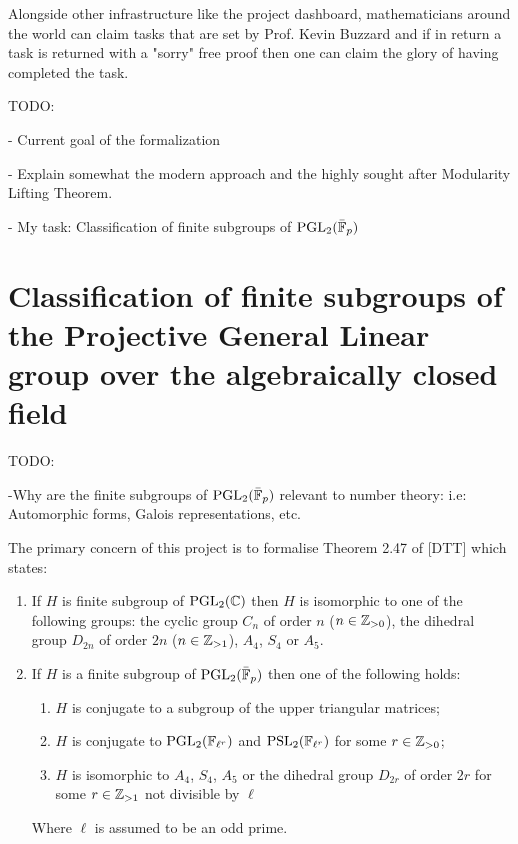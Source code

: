 Alongside other infrastructure like the project dashboard, mathematicians around the world can claim tasks that are set by Prof. Kevin Buzzard and if in return a task is returned with a "sorry" free proof then one can claim the glory of having completed the task.

TODO:

- Current goal of the formalization

- Explain somewhat the modern approach and the highly sought after Modularity Lifting Theorem.

- My task: Classification of finite subgroups of $\operatorname{PGL}_2(\bar{\mathbb{F}}_p)$



\section{Classification of finite subgroups of the Projective General Linear group over the algebraically closed field}

TODO:

-Why are the finite subgroups of  $\operatorname{PGL}_2(\bar{\mathbb{F}}_p)$ relevant to number theory: i.e: Automorphic forms, Galois representations, etc.


The primary concern of this project is to formalise Theorem 2.47 of [DTT] which states:

\begin{enumerate}
    \item If $H$ is finite subgroup of $\operatorname{PGL}_2(\mathbb{C})$ then $H$ is isomorphic to one of the following groups: the cyclic group $C_n$ of order $n$ ($n \in \mathbb{Z}_{>0}$), the dihedral group $D_{2n}$ of order $2n$ ($n \in \mathbb{Z}_{>1}$), $A_4$, $S_4$ or $A_5$.
\item If $H$ is a finite subgroup of $\operatorname{PGL}_2(\bar{\mathbb{F}}_p)$ then one of the following holds:
\begin{enumerate}
    \item $H$ is conjugate to a subgroup of the upper triangular matrices;
    \item $H$ is conjugate to $\operatorname{PGL}_2(\mathbb{F}_{\ell^r})$ and $\operatorname{PSL}_2(\mathbb{F}_{\ell^{r}})$ for some $r \in \mathbb{Z}_{>0}$;
    \item $H$ is isomorphic to $A_4$, $S_4$, $A_5$ or the dihedral group $D_{2r}$ of order $2r$ for some $r \in \mathbb{Z}_{>1}$ not divisible by $\ell$

\end{enumerate}
    Where $\ell$ is assumed to be an odd prime.
\end{enumerate}



